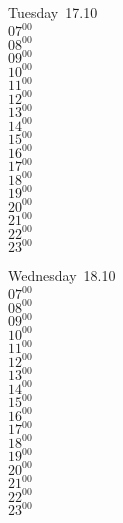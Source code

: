 \documentclass[11pt, a4paper]{book}\usepackage[]{graphicx}\usepackage[]{color}
\begin{document}
\begin{weekdaybox}
  Tuesday~17.10\\
  { 
  \vfill
  $07^{00}$\\
$08^{00}$\\
$09^{00}$\\
$10^{00}$\\
$11^{00}$\\
$12^{00}$\\
$13^{00}$\\
$14^{00}$\\
$15^{00}$\\
$16^{00}$\\
$17^{00}$\\
$18^{00}$\\
$19^{00}$\\
$20^{00}$\\
$21^{00}$\\
$22^{00}$\\
$23^{00}$\\
  }
\end{weekdaybox}
\begin{weekdaybox}
  Wednesday~18.10\\
  { 
  \vfill
  $07^{00}$\\
$08^{00}$\\
$09^{00}$\\
$10^{00}$\\
$11^{00}$\\
$12^{00}$\\
$13^{00}$\\
$14^{00}$\\
$15^{00}$\\
$16^{00}$\\
$17^{00}$\\
$18^{00}$\\
$19^{00}$\\
$20^{00}$\\
$21^{00}$\\
$22^{00}$\\
$23^{00}$\\
  }
\end{weekdaybox}
\clearpage
\begin{headerbox}
\end{headerbox}
\end{document}
